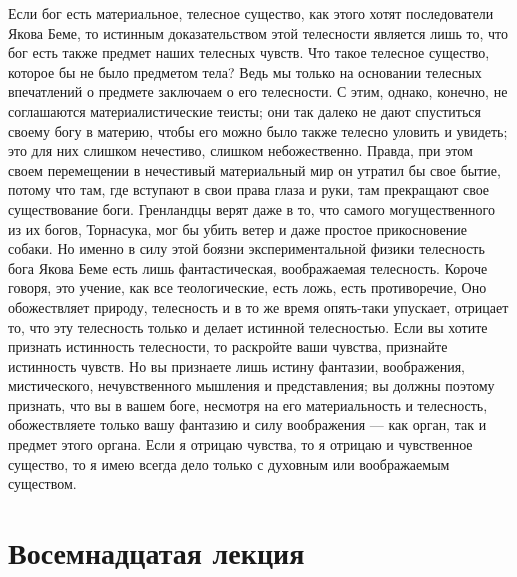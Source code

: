 \documentclass[12pt]{article}
\begin{document}
Если бог есть материальное, телесное существо, как этого хотят последователи Якова Беме, то истинным доказательством этой телесности является лишь то, что бог есть также предмет наших телесных чувств. Что такое телесное существо, которое бы не было предметом тела? Ведь мы только на основании телесных впечатлений о предмете заключаем о его телесности. С этим, однако, конечно, не соглашаются материалистические теисты; они так далеко не дают спуститься своему богу в материю, чтобы его можно было также телесно уловить и увидеть; это для них слишком нечестиво, слишком небожественно. Правда, при этом своем перемещении в нечестивый материальный мир он утратил бы свое бытие, потому что там, где вступают в свои права глаза и руки, там прекращают свое существование боги. Гренландцы верят даже в то, что самого могущественного из их богов, Торнасука, мог бы убить ветер и даже простое прикосновение собаки. Но именно в силу этой боязни экспериментальной физики телесность бога Якова Беме есть лишь фантастическая, воображаемая телесность. Короче говоря, это учение, как все теологические, есть ложь, есть противоречие, Оно обожествляет природу, телесность и в то же время опять-таки упускает, отрицает то, что эту телесность только и делает истинной телесностью. Если вы хотите признать истинность телесности, то раскройте ваши чувства, признайте истинность чувств. Но вы признаете лишь истину фантазии, воображения, мистического, нечувственного мышления и представления; вы должны поэтому признать, что вы в вашем боге, несмотря на его материальность и телесность, обожествляете только вашу фантазию и силу воображения --- как орган, так и предмет этого органа. Если я отрицаю чувства, то я отрицаю и чувственное существо, то я имею всегда дело только с духовным или воображаемым существом. 

{}
\section*{Восемнадцатая лекция}
\end{document}
